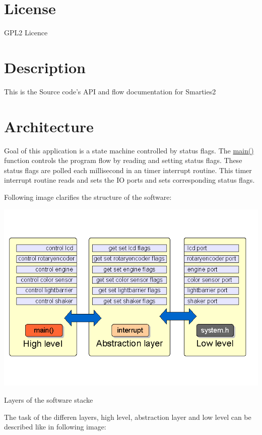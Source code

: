 \hypertarget{index_intro}{}\section{License}\label{index_intro}
GPL2 Licence\hypertarget{index_install}{}\section{Description}\label{index_install}
This is the Source code's API and flow documentation for Smarties2\hypertarget{index_arch}{}\section{Architecture}\label{index_arch}
Goal of this application is a state machine controlled by status flags. The \hyperlink{smarties2_8c_840291bc02cba5474a4cb46a9b9566fe}{main()} function controls the program flow by reading and setting status flags. These status flags are polled each millisecond in an timer interrupt routine. This timer interrupt routine reads and sets the IO ports and sets corresponding status flags.

Following image clarifies the structure of the software:

 \begin{Image}
\begin{center}
\includegraphics[width=15cm]{api-layer.png}\caption{Layers of the software stacke}
\end{center}
\end{Image}


The task of the differen layers, high level, abstraction layer and low level can be described like in following image:

